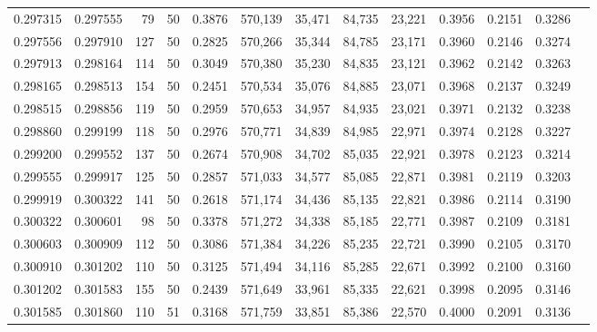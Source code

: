\begin{tabular}{rrrrrrrrrrrrr}
0.297315 & 0.297555 &    79 &  50 &                                     0.3876 & 570,139 &  35,471 &  84,735 &  23,221 & 0.3956 & 0.2151 & 0.3286 \\
0.297556 & 0.297910 &   127 &  50 &                                     0.2825 & 570,266 &  35,344 &  84,785 &  23,171 & 0.3960 & 0.2146 & 0.3274 \\
0.297913 & 0.298164 &   114 &  50 &                                     0.3049 & 570,380 &  35,230 &  84,835 &  23,121 & 0.3962 & 0.2142 & 0.3263 \\
0.298165 & 0.298513 &   154 &  50 &                                     0.2451 & 570,534 &  35,076 &  84,885 &  23,071 & 0.3968 & 0.2137 & 0.3249 \\
0.298515 & 0.298856 &   119 &  50 &                                     0.2959 & 570,653 &  34,957 &  84,935 &  23,021 & 0.3971 & 0.2132 & 0.3238 \\
0.298860 & 0.299199 &   118 &  50 &                                     0.2976 & 570,771 &  34,839 &  84,985 &  22,971 & 0.3974 & 0.2128 & 0.3227 \\
0.299200 & 0.299552 &   137 &  50 &                                     0.2674 & 570,908 &  34,702 &  85,035 &  22,921 & 0.3978 & 0.2123 & 0.3214 \\
0.299555 & 0.299917 &   125 &  50 &                                     0.2857 & 571,033 &  34,577 &  85,085 &  22,871 & 0.3981 & 0.2119 & 0.3203 \\
0.299919 & 0.300322 &   141 &  50 &                                     0.2618 & 571,174 &  34,436 &  85,135 &  22,821 & 0.3986 & 0.2114 & 0.3190 \\
0.300322 & 0.300601 &    98 &  50 &                                     0.3378 & 571,272 &  34,338 &  85,185 &  22,771 & 0.3987 & 0.2109 & 0.3181 \\
0.300603 & 0.300909 &   112 &  50 &                                     0.3086 & 571,384 &  34,226 &  85,235 &  22,721 & 0.3990 & 0.2105 & 0.3170 \\
0.300910 & 0.301202 &   110 &  50 &                                     0.3125 & 571,494 &  34,116 &  85,285 &  22,671 & 0.3992 & 0.2100 & 0.3160 \\
0.301202 & 0.301583 &   155 &  50 &                                     0.2439 & 571,649 &  33,961 &  85,335 &  22,621 & 0.3998 & 0.2095 & 0.3146 \\
0.301585 & 0.301860 &   110 &  51 &                                     0.3168 & 571,759 &  33,851 &  85,386 &  22,570 & 0.4000 & 0.2091 & 0.3136 \\

\end{tabular}
